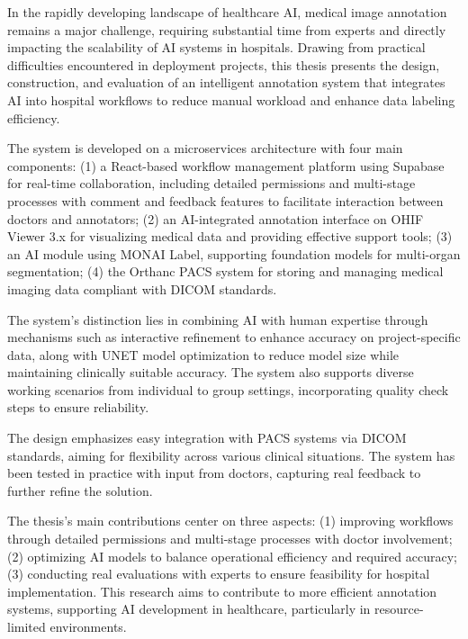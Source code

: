 \begin{EnAbstract}

In the rapidly developing landscape of healthcare AI, medical image annotation remains a major challenge, requiring substantial time from experts and directly impacting the scalability of AI systems in hospitals. Drawing from practical difficulties encountered in deployment projects, this thesis presents the design, construction, and evaluation of an intelligent annotation system that integrates AI into hospital workflows to reduce manual workload and enhance data labeling efficiency.

The system is developed on a microservices architecture with four main components: (1) a React-based workflow management platform using Supabase for real-time collaboration, including detailed permissions and multi-stage processes with comment and feedback features to facilitate interaction between doctors and annotators; (2) an AI-integrated annotation interface on OHIF Viewer 3.x for visualizing medical data and providing effective support tools; (3) an AI module using MONAI Label, supporting foundation models for multi-organ segmentation; (4) the Orthanc PACS system for storing and managing medical imaging data compliant with DICOM standards.

The system's distinction lies in combining AI with human expertise through mechanisms such as interactive refinement to enhance accuracy on project-specific data, along with UNET model optimization to reduce model size while maintaining clinically suitable accuracy. The system also supports diverse working scenarios from individual to group settings, incorporating quality check steps to ensure reliability.

The design emphasizes easy integration with PACS systems via DICOM standards, aiming for flexibility across various clinical situations. The system has been tested in practice with input from doctors, capturing real feedback to further refine the solution.

The thesis's main contributions center on three aspects: (1) improving workflows through detailed permissions and multi-stage processes with doctor involvement; (2) optimizing AI models to balance operational efficiency and required accuracy; (3) conducting real evaluations with experts to ensure feasibility for hospital implementation. This research aims to contribute to more efficient annotation systems, supporting AI development in healthcare, particularly in resource-limited environments.

\end{EnAbstract}